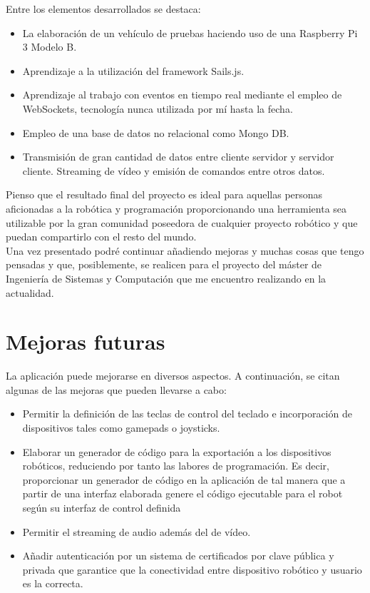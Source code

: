 Entre los elementos desarrollados se destaca:

\begin{itemize}
 \item La elaboración de un vehículo de pruebas haciendo uso de una Raspberry Pi 3 Modelo B.
 \item Aprendizaje a la utilización del framework Sails.js.
 \item Aprendizaje al trabajo con eventos en tiempo real mediante el empleo de WebSockets, tecnología nunca utilizada por mí hasta la fecha.
 \item Empleo de una base de datos no relacional como Mongo DB.
 \item Transmisión de gran cantidad de datos entre cliente servidor y servidor cliente. Streaming de vídeo y emisión de comandos entre otros datos.
\end{itemize}


Pienso que el resultado final del proyecto es ideal para aquellas personas aficionadas a la robótica y programación proporcionando una herramienta sea utilizable por la gran comunidad poseedora 
de cualquier proyecto robótico y que puedan compartirlo con el resto del mundo.\\

Una vez presentado podré continuar añadiendo mejoras y muchas cosas que tengo pensadas y que, posiblemente, se realicen para el proyecto del máster de Ingeniería de Sistemas y Computación que me 
encuentro realizando en la actualidad.\\

\section{Mejoras futuras}

La aplicación puede mejorarse en diversos aspectos. A continuación, se citan algunas de las mejoras que pueden llevarse a cabo:

\begin{itemize}

\item Permitir la definición de las teclas de control del teclado e incorporación de dispositivos tales como gamepads o joysticks.

\item Elaborar un generador de código para la exportación a los dispositivos robóticos, reduciendo por tanto las labores de programación. Es decir, proporcionar un generador de código
en la aplicación de tal manera que a partir de una interfaz elaborada genere el código ejecutable para el robot según su interfaz de control definida\\

\item Permitir el streaming de audio además del de vídeo.\\

\item Añadir autenticación por un sistema de certificados por clave pública y privada que garantice que la conectividad entre dispositivo robótico y usuario es la correcta.\\

\end{itemize}


